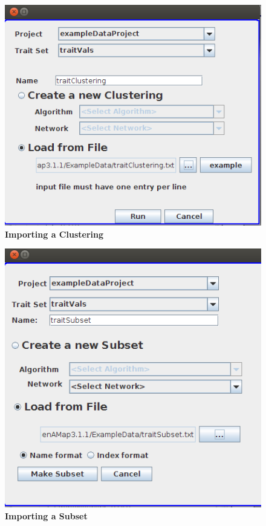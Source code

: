 \documentclass{article}
\begin{document}
\begin{figure}
\includegraphics[width=\textwidth]{Figure5.png}
\caption{\textbf{Importing a Clustering}}
\end{figure}

\begin{figure}
\includegraphics[width=\textwidth]{Figure6.png}
\caption{\textbf{Importing a Subset}}
\end{figure}
\end{document}
